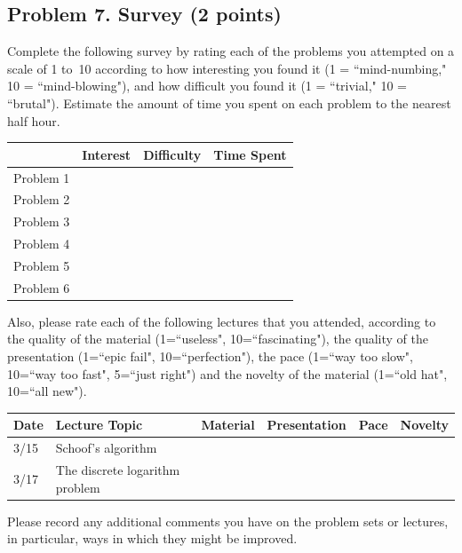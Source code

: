 \documentclass[11pt]{article}
\begin{document}
\subsection*{Problem 7. Survey (2 points)}
Complete the following survey by rating each of the problems you attempted on a scale of 1 to~10 according to how interesting you found it (1 = ``mind-numbing," 10 = ``mind-blowing"), and how difficult you found it (1 = ``trivial," 10 = ``brutal").  Estimate the amount of time you spent on each problem to the nearest half hour.

\begin{center}
\begin{tabular}{l|r|r|r|}
& Interest & Difficulty & Time Spent\\\hline
Problem 1 & & & \\\hline
Problem 2 & & & \\\hline
Problem 3 & & & \\\hline
Problem 4 & & & \\\hline
Problem 5 & & & \\\hline
Problem 6 & & & \\\hline
\end{tabular}
\end{center}
\noindent
Also, please rate each of the following lectures that you attended, according to the quality of the material (1=``useless", 10=``fascinating"), the quality of the presentation (1=``epic fail", 10=``perfection"), the pace (1=``way too slow", 10=``way too fast", 5=``just right") and the novelty of the material (1=``old hat", 10=``all new").

\begin{center}
\begin{tabular}{l|l|r|r|r|r|}
Date & Lecture Topic & Material & Presentation & Pace & Novelty\\\hline
3/15 & Schoof's algorithm & & & &\\\hline 
3/17 & The discrete logarithm problem & & & &\\\hline 
\end{tabular}
\end{center}

\noindent
Please record any additional comments you have on the problem sets or lectures, in particular, ways in which they might be improved.
\end{document}
